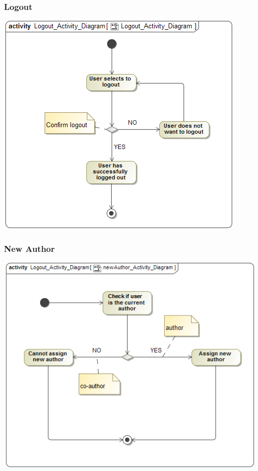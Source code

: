\documentclass[11pt]{article}
\begin{document}
\begin{center}
\newpage
\subsubsection{Logout}
\begin{center} 
	\includegraphics[width=\textwidth]{../Images/Logout_Activity_Diagram.png}\\[0.5cm]
\end{center}

\newpage
\subsubsection{New Author}
\begin{center} 
	\includegraphics[width=\textwidth]{../Images/newAuthor_Activity_Diagram.png}\\[0.5cm]
\end{center}


\end{center}
\end{document}
